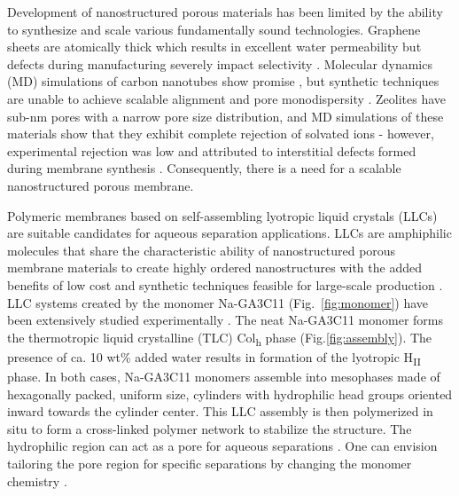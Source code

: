 \documentclass{article}
\begin{document}

  Development of nanostructured porous materials has been limited by the
  ability to synthesize and scale various fundamentally sound technologies.
  Graphene sheets are atomically thick which results in excellent water
  permeability but defects during manufacturing severely impact selectivity
  \cite{cohen-tanugi_multilayer_2016}. Molecular dynamics (MD) simulations of
  carbon nanotubes show promise \cite{humplik_nanostructured_2011}, but synthetic
  techniques are unable to achieve scalable alignment and pore monodispersity
  \cite{hata_water-assisted_2004,maruyama_growth_2005}. Zeolites have sub-nm
  pores with a narrow pore size distribution, and MD simulations of these
  materials show that they exhibit complete rejection of solvated ions
  \cite{murad_molecular_1998}- however, experimental rejection was low and
  attributed to interstitial defects formed during membrane synthesis
  \cite{li_desalination_2004}. Consequently, there is a need for a scalable
  nanostructured porous membrane. 

  Polymeric membranes based on self-assembling lyotropic liquid crystals (LLCs)
  are suitable candidates for aqueous separation applications. LLCs are
  amphiphilic molecules that share the characteristic ability of nanostructured
  porous membrane materials to create highly ordered nanostructures with the
  added benefits of low cost and synthetic techniques feasible for large-scale
  production \cite{feng_scalable_2014}. LLC systems created by the monomer
  Na-GA3C11 (Fig.~\ref{fig:monomer}) have been extensively studied experimentally
  \cite{feng_scalable_2014,smith_ordered_1997,zhou_supported_2005,resel_h2-phase_2000,feng_thin_2016}.
  The neat Na-GA3C11 monomer forms the thermotropic liquid crystalline (TLC)
  Col\textsubscript{h} phase (Fig.\ref{fig:assembly}). The presence of ca. 10
  wt\% added water results in formation of the lyotropic H\textsubscript{II}
  phase. In both cases, Na-GA3C11 monomers assemble into mesophases made of
  hexagonally packed, uniform size, cylinders with hydrophilic head groups
  oriented inward towards the cylinder center. This LLC assembly is then
  polymerized in situ to form a cross-linked polymer network to stabilize the
  structure. The hydrophilic region can act as a pore for aqueous separations
  \cite{zhou_supported_2005}.  One can envision tailoring the pore region for
  specific separations by changing the monomer chemistry
  \cite{resel_h2-phase_2000}.
\end{document}
